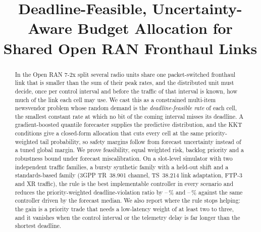 \documentclass[conference]{IEEEtran}
\begin{document}
\title{Deadline-Feasible, Uncertainty-Aware Budget Allocation for Shared Open RAN Fronthaul Links}

\author{
}

\maketitle

\begin{abstract}
In the Open RAN 7-2x split several radio units share one packet-switched fronthaul link that is smaller than the sum of their peak rates, and the distributed unit must decide, once per control interval and before the traffic of that interval is known, how much of the link each cell may use. We cast this as a constrained multi-item newsvendor problem whose random demand is the \emph{deadline-feasible rate} of each cell, the smallest constant rate at which no bit of the coming interval misses its deadline. A gradient-boosted quantile forecaster supplies the predictive distribution, and the KKT conditions give a closed-form allocation that cuts every cell at the same priority-weighted tail probability, so safety margins follow from forecast uncertainty instead of a tuned global margin. We prove feasibility, equal weighted risk, backlog priority and a robustness bound under forecast miscalibration. On a slot-level simulator with two independent traffic families, a bursty synthetic family with a held-out shift and a standards-based family (3GPP TR~38.901 channel, TS~38.214 link adaptation, FTP-3 and XR traffic), the rule is the best implementable controller in every scenario and reduces the priority-weighted deadline-violation ratio by \redPFmin{}--\redPFmax{}\,\% and \redtgpphighpointforecast{}--\redtgppmoderatepointforecast{}\,\% against the same controller driven by the forecast median. We also report where the rule stops helping: the gain is a priority trade that needs a low-latency weight of at least two to three, and it vanishes when the control interval or the telemetry delay is far longer than the shortest deadline.
\end{abstract}
\end{document}
